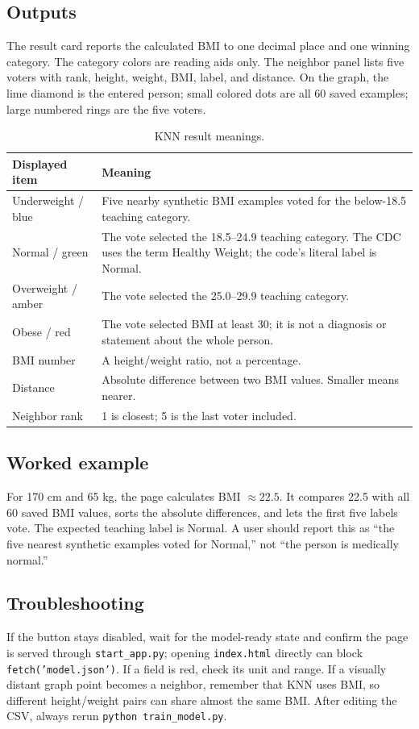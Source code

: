 \documentclass[12pt,a4paper,openany]{report}
\begin{document}
\subsection{Outputs}
The result card reports the calculated BMI to one decimal place and one winning
category. The category colors are reading aids only. The neighbor panel lists
five voters with rank, height, weight, BMI, label, and distance. On the graph,
the lime diamond is the entered person; small colored dots are all 60 saved
examples; large numbered rings are the five voters.

\begin{table}[H]
\centering\small
\caption{KNN result meanings.}
\begin{tabularx}{\textwidth}{p{}Y}
\toprule
\textbf{Displayed item} & \textbf{Meaning} \\
\midrule
Underweight / blue & Five nearby synthetic BMI examples voted for the below-18.5 teaching category. \\
Normal / green & The vote selected the 18.5--24.9 teaching category. The CDC uses the term Healthy Weight; the code's literal label is Normal. \\
Overweight / amber & The vote selected the 25.0--29.9 teaching category. \\
Obese / red & The vote selected BMI at least 30; it is not a diagnosis or statement about the whole person. \\
BMI number & A height/weight ratio, not a percentage. \\
Distance & Absolute difference between two BMI values. Smaller means nearer. \\
Neighbor rank & 1 is closest; 5 is the last voter included. \\
\bottomrule
\end{tabularx}
\end{table}

\subsection{Worked example}
For 170 cm and 65 kg, the page calculates BMI $\approx22.5$. It compares 22.5
with all 60 saved BMI values, sorts the absolute differences, and lets the first
five labels vote. The expected teaching label is Normal. A user should report
this as ``the five nearest synthetic examples voted for Normal,'' not ``the
person is medically normal.''

\subsection{Troubleshooting}
If the button stays disabled, wait for the model-ready state and confirm the
page is served through \texttt{start\_app.py}; opening \texttt{index.html}
directly can block \texttt{fetch('model.json')}. If a field is red, check its
unit and range. If a visually distant graph point becomes a neighbor, remember
that KNN uses BMI, so different height/weight pairs can share almost the same
BMI. After editing the CSV, always rerun \texttt{python train\_model.py}.
\end{document}
